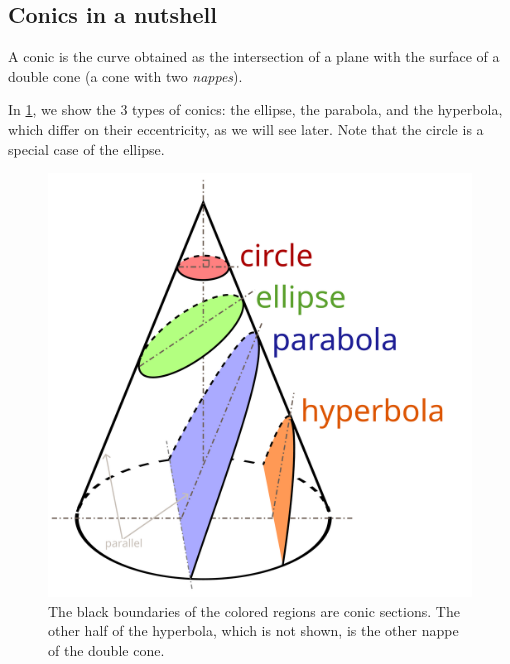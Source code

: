 \documentclass[../main.tex]{subfiles}
\begin{document}
\subsection{Conics in a nutshell}
\begin{definition}
  A conic is the curve obtained as the intersection of a plane with the surface of a double cone (a cone with two \emph{nappes}).
\end{definition}
In \cref{fig:conics}, we show the 3 types of conics: the ellipse, the parabola, and the hyperbola, which differ on their eccentricity, as we will see later. Note that the circle is a special case of the ellipse.
\begin{figure}[htbp]
  \centering
  \begin{minipage}[t]{0.45\textwidth}
    \centering
    \includegraphics[width=\textwidth]{Images/Conic_Sections.pdf}
    \caption{The black boundaries of the colored regions are conic sections. The other half of the hyperbola, which is not shown, is the other nappe of the double cone.}
    \label{fig:conics}
  \end{minipage}
  \hfill
  \begin{minipage}[t]{0.45\textwidth}
    \centering

\end{minipage}
\end{figure}
\end{document}
